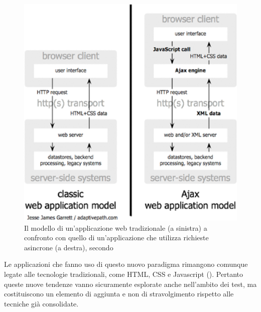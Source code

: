 \begin{figure}[htbp]
\begin{center}
\includegraphics[scale=0.8]{images/classic_vs_ajax.eps}
\caption{Il modello di un'applicazione web tradizionale (a sinistra) a confronto con quello di un'applicazione che utilizza richieste asincrone (a destra), secondo \cite{ajaxGarrett} }
\label{default}
\end{center}
\end{figure}

Le applicazioni che fanno uso di questo nuovo paradigma rimangono comunque legate alle tecnologie tradizionali, come HTML, CSS e Javascript (\cite{ajaxGarrett}). Pertanto queste nuove tendenze vanno sicuramente esplorate anche nell'ambito dei test, ma costituiscono un elemento di aggiunta e non di stravolgimento rispetto alle tecniche già consolidate.

 

